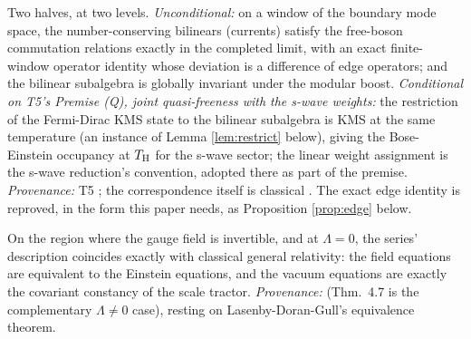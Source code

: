 \begin{fact}\label{fact:boson}
Two halves, at two levels. \emph{Unconditional:} on a window of the boundary mode space, the number-conserving bilinears (currents) satisfy the free-boson commutation relations exactly in the completed limit, with an exact finite-window operator identity whose deviation is a difference of edge operators; and the bilinear subalgebra is globally invariant under the modular boost. \emph{Conditional on T5's Premise (Q), joint quasi-freeness with the s-wave weights:} the restriction of the Fermi-Dirac KMS state to the bilinear subalgebra is KMS at the same temperature (an instance of Lemma \ref{lem:restrict} below), giving the Bose-Einstein occupancy at $T_{\mathrm{H}}$ for the s-wave sector; the linear weight assignment is the s-wave reduction's convention, adopted there as part of the premise. \emph{Provenance:} T5 \cite[Prem.~8.1, Thm.~8.2]{ButlerT5}; the correspondence itself is classical \cite{FrenkelKac1980}. The exact edge identity is reproved, in the form this paper needs, as Proposition \ref{prop:edge} below.
\end{fact}

\begin{fact}\label{fact:exterior}
On the region where the gauge field is invertible, and at $\Lambda = 0$, the series' description coincides exactly with classical general relativity: the field equations are equivalent to the Einstein equations, and the vacuum equations are exactly the covariant constancy of the scale tractor. \emph{Provenance:} \cite[Fact 2.1, Thms.~4.5 and 4.7]{ButlerT6} (Thm.~4.7 is the complementary $\Lambda \neq 0$ case), resting on Lasenby-Doran-Gull's equivalence theorem.
\end{fact}

